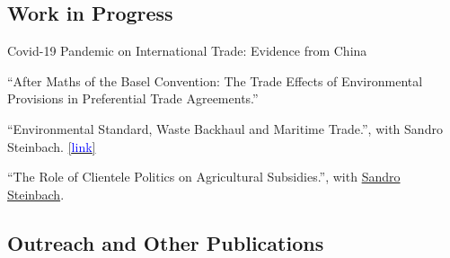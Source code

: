 \documentclass[11 pt,letterpaper]{article}
\renewenvironment{itemize}{
	\begin{list}{}{
			\setlength{\leftmargin}{1.5em}
		}
	}{
	\end{list}
}
\begin{document}
 
 \subsection*{\textbf{ Work in Progress}}
 
 \begin{itemize}
 	\item[-] Covid-19 Pandemic on International Trade: Evidence from China 
 	
 	\item[-] ``After Maths of the Basel Convention: The Trade Effects of Environmental Provisions in Preferential Trade Agreements.''
 	 	
 	
 	\item[-] ``Environmental Standard, Waste Backhaul and Maritime Trade.'',
 	with Sandro Steinbach. 
 	\href{https://scholar.google.com/citations?view_op=view_citation&hl=en&user=gSddLM4AAAAJ&citation_for_view=gSddLM4AAAAJ:9yKSN-GCB0IC}{[{\underline{\textcolor{blue}{link}}}]}
 	
 
 	
 	\item[-] ``The Role of Clientele Politics on Agricultural Subsidies.'',
 	with
 	\href{https://are.uconn.edu/person/sandro-steinbach/}{Sandro Steinbach}.   
 	

 	
 	

 	
 \end{itemize}
 

\subsection*{\textbf{Outreach and Other Publications}}
\end{document}

